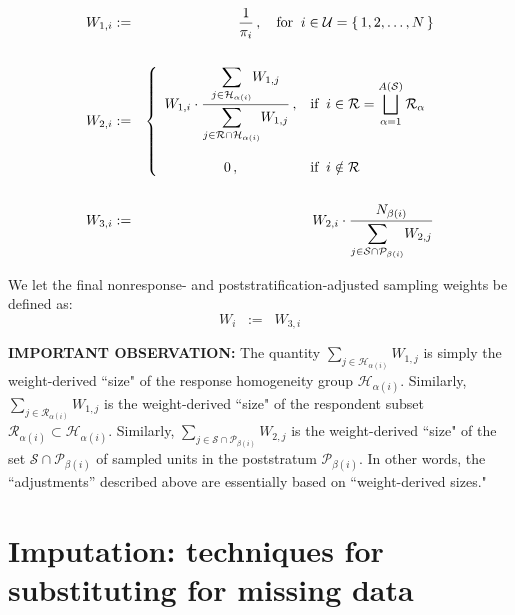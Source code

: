 \documentclass{article}
\begin{document}
\begin{eqnarray*}
W_{1,i} & := & \dfrac{1}{\pi_{i}}\,, \quad\textnormal{for}\;\; i \in \mathcal{U} = \left\{\,1,2,\ldots,N\,\right\} \\ \\
W_{2,i} & := &
\left\{\begin{array}{cl}
W_{1,i}\cdot\dfrac{\displaystyle{\sum_{j\in \mathcal{H}_{\alpha(i)}}} W_{1,j}}{\displaystyle{\sum_{j\in\mathcal{R}\cap\mathcal{H}_{\alpha(i)}}} W_{1,j}}\,, & \textnormal{if} \;\; i \in \mathcal{R} = \displaystyle{\bigsqcup_{\alpha=1}^{A(\mathcal{S})}}\,\mathcal{R}_{\alpha}
\\ \\
0\,,& \textnormal{if} \;\; i \notin \mathcal{R}
\end{array}\right.
\\ \\
W_{3,i} & := &
W_{2,i}\cdot\dfrac{N_{\beta(i)}}{\displaystyle{\sum_{j\in\mathcal{S}\cap\mathcal{P}_{\beta(i)}}} W_{2,j}}
\end{eqnarray*}

\noindent
We let the final nonresponse- and poststratification-adjusted sampling weights be defined as:
\begin{equation*}
W_{i} \;\; := \;\;  W_{3,i}
\end{equation*}

\noindent
\textbf{IMPORTANT OBSERVATION:}\;\; The quantity $\displaystyle{\sum_{j\in \mathcal{H}_{\alpha(i)}}} W_{1,j}$ is simply the weight-derived ``size" of the response homogeneity group $\mathcal{H}_{\alpha(i)}$.
Similarly, $\displaystyle{\sum_{j\in \mathcal{R}_{\alpha(i)}}} W_{1,j}$ is the weight-derived ``size" of the respondent subset $\mathcal{R}_{\alpha(i)} \subset \mathcal{H}_{\alpha(i)}$.  Similarly, $\displaystyle{\sum_{j\in\mathcal{S}\cap\mathcal{P}_{\beta(i)}}} W_{2,j}$ is the weight-derived ``size" of the set $\mathcal{S}\cap\mathcal{P}_{\beta(i)}$ of sampled units in the poststratum $\mathcal{P}_{\beta(i)}$.  In other words, the ``adjustments'' described above are essentially based on ``weight-derived sizes."


\section{Imputation: techniques for substituting for missing data}
\setcounter{theorem}{0}
\end{document}
